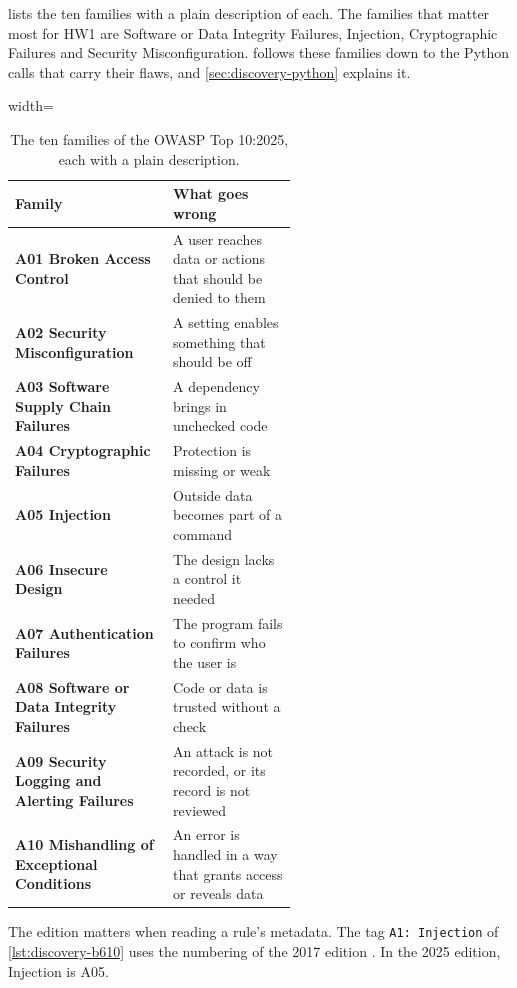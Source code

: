 lists the ten families with a plain description of each. The families
that matter most for HW1 are Software or Data Integrity Failures, Injection, Cryptographic Failures
and Security Misconfiguration.  follows these families down to the
Python calls that carry their flaws, and \cref{sec:discovery-python} explains it.

\begin{table}[htbp]
  \caption{The ten families of the OWASP Top 10:2025, each with a plain description.}
  \label{tab:discovery-top10}
  \begin{adjustbox}{width=\linewidth}\begin{tabularx}{\linewidth}{>{\RaggedRight\arraybackslash\hyphenpenalty=10000\exhyphenpenalty=10000}p{0.56\linewidth}X}
    \toprule
    \textbf{Family} & \textbf{What goes wrong} \\
    \midrule
    \textbf{A01 Broken Access Control} & A user reaches data or actions that should be denied to them \\
    \textbf{A02 Security Misconfiguration} & A setting enables something that should be off \\
    \textbf{A03 Software Supply Chain Failures} & A dependency brings in unchecked code \\
    \textbf{A04 Cryptographic Failures} & Protection is missing or weak \\
    \textbf{A05 Injection} & Outside data becomes part of a command \\
    \textbf{A06 Insecure Design} & The design lacks a control it needed \\
    \textbf{A07 Authentication Failures} & The program fails to confirm who the user is \\
    \textbf{A08 Software or Data Integrity Failures} & Code or data is trusted without a check \\
    \textbf{A09 Security Logging and Alerting Failures} & An attack is not recorded, or its record is not reviewed \\
    \textbf{A10 Mishandling of Exceptional Conditions} & An error is handled in a way that grants access or reveals data \\
    \bottomrule
  \end{tabularx}\end{adjustbox}
\end{table}

The edition matters when reading a rule's metadata. The tag \texttt{A1: Injection} of
\cref{lst:discovery-b610} uses the numbering of the 2017 edition \citep{owasp2017top10}. In the 2025
edition, Injection is A05.

